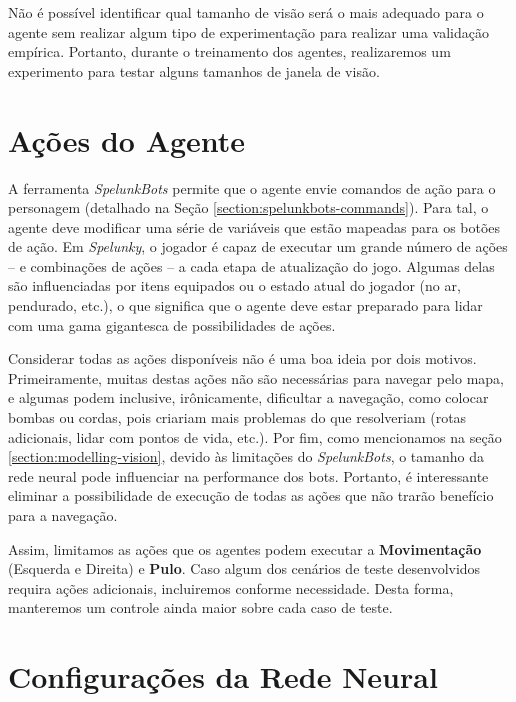 
Não é possível identificar qual tamanho de visão será o mais adequado para o
agente sem realizar algum tipo de experimentação para realizar uma validação
empírica. Portanto, durante o treinamento dos agentes, realizaremos um
experimento para testar alguns tamanhos de janela de visão.


\section{\label{section:modelling-outputs}Ações do Agente}
A ferramenta \textit{SpelunkBots} permite que o agente envie comandos de ação
para o personagem (detalhado na Seção \ref{section:spelunkbots-commands}). Para
tal, o agente deve modificar uma série de variáveis que estão mapeadas para os
botões de ação. Em \textit{Spelunky}, o jogador é capaz de executar um grande
número de ações -- e combinações de ações -- a cada etapa de atualização do
jogo. Algumas delas são influenciadas por itens equipados ou o estado atual do
jogador (no ar, pendurado, etc.), o que significa que o agente deve estar
preparado para lidar com uma gama gigantesca de possibilidades de ações.

Considerar todas as ações disponíveis não é uma boa ideia por dois motivos.
Primeiramente, muitas destas ações não são necessárias para navegar pelo mapa, e
algumas podem inclusive, irônicamente, dificultar a navegação, como colocar
bombas ou cordas, pois criariam mais problemas do que resolveriam (rotas
adicionais, lidar com pontos de vida, etc.). Por fim, como mencionamos na seção
\ref{section:modelling-vision}, devido às limitações do \textit{SpelunkBots}, o
tamanho da rede neural pode influenciar na performance dos bots. Portanto, é
interessante eliminar a possibilidade de execução de todas as ações que não
trarão benefício para a navegação.

Assim, limitamos as ações que os agentes podem executar a \textbf{Movimentação}
(Esquerda e Direita) e \textbf{Pulo}. Caso algum dos cenários de teste
desenvolvidos requira ações adicionais, incluiremos conforme necessidade. Desta
forma, manteremos um controle ainda maior sobre cada caso de teste.


\section{\label{section:modelling-network}Configurações da Rede Neural}


